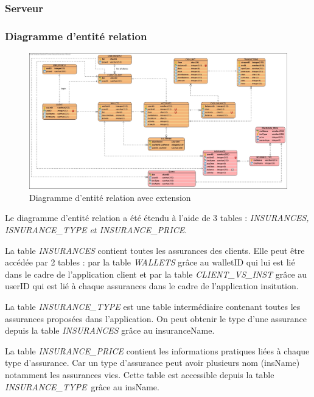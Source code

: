 \documentclass[../rapport.tex]{subfiles}
\begin{document}
		\subsubsection{Serveur}
		\subsubsection{Diagramme d'entité relation}

				\begin{figure}[h]
						\centering\includegraphics[scale=0.25]{ressources/photos_diagrammes/extensionThomas/erdThomas.jpg}
						\caption{Diagramme d'entité relation avec extension}
				\end{figure}
		Le diagramme d'entité relation a été étendu à l'aide de 3 tables : \textit{INSURANCES, ISNURANCE\_TYPE et INSURANCE\_PRICE}.
				
		\medskip

		La table \textit{INSURANCES} contient toutes les assurances des clients. Elle peut être accédée par 2 tables : par la table \textit{WALLETS} grâce au walletID qui lui est lié dans le cadre de l'application client et par la table \textit{CLIENT\_VS\_INST} grâce au userID qui est lié à chaque assurances dans le cadre de l'application insitution.

		\medskip

		La table \textit{INSURANCE\_TYPE} est une table intermédiaire contenant toutes les assurances proposées dans l'application. On peut obtenir le type d'une assurance depuis la table \textit{INSURANCES} grâce au insuranceName.

		\medskip

		La table \textit{INSURANCE\_PRICE} contient les informations pratiques liées à chaque type d'assurance. Car un type d'assurance peut avoir plusieurs nom (insName) notamment les assurances vies. Cette table est accessible depuis la table \textit{INSURANCE\_TYPE} grâce au insName.
\end{document}

